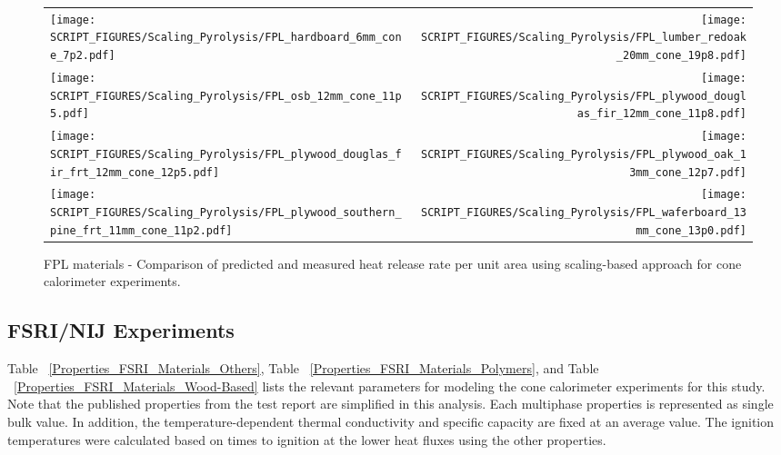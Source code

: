 \begin{figure}[p]
\begin{tabular*}{\textwidth}{l@{\extracolsep{\fill}}r}
\texttt{[image: SCRIPT\_FIGURES/Scaling\_Pyrolysis/FPL\_hardboard\_6mm\_cone\_7p2.pdf]} &
\texttt{[image: SCRIPT\_FIGURES/Scaling\_Pyrolysis/FPL\_lumber\_redoak\_20mm\_cone\_19p8.pdf]} \\
\texttt{[image: SCRIPT\_FIGURES/Scaling\_Pyrolysis/FPL\_osb\_12mm\_cone\_11p5.pdf]} &
\texttt{[image: SCRIPT\_FIGURES/Scaling\_Pyrolysis/FPL\_plywood\_douglas\_fir\_12mm\_cone\_11p8.pdf]} \\
\texttt{[image: SCRIPT\_FIGURES/Scaling\_Pyrolysis/FPL\_plywood\_douglas\_fir\_frt\_12mm\_cone\_12p5.pdf]} &
\texttt{[image: SCRIPT\_FIGURES/Scaling\_Pyrolysis/FPL\_plywood\_oak\_13mm\_cone\_12p7.pdf]} \\
\texttt{[image: SCRIPT\_FIGURES/Scaling\_Pyrolysis/FPL\_plywood\_southern\_pine\_frt\_11mm\_cone\_11p2.pdf]} &
\texttt{[image: SCRIPT\_FIGURES/Scaling\_Pyrolysis/FPL\_waferboard\_13mm\_cone\_13p0.pdf]} \\
\end{tabular*}
\caption[HRRPUA of FPL Materials using scaling model]
{FPL materials - Comparison of predicted and measured heat release rate per unit area using scaling-based approach for cone calorimeter experiments.}
\label{FPL_Materials_HRR_Wood-Based}
\end{figure}

\clearpage

\subsection{FSRI/NIJ Experiments}\label{sec_FSRI_NIJ_Materials}

Table ~\ref{Properties_FSRI_Materials_Others}, Table ~\ref{Properties_FSRI_Materials_Polymers}, and Table ~\ref{Properties_FSRI_Materials_Wood-Based} lists the relevant parameters for modeling the cone calorimeter experiments for this study.
Note that the published properties from the test report are simplified in this analysis. Each multiphase properties is represented as single bulk value.
In addition, the temperature-dependent thermal conductivity and specific capacity are fixed at an average value.
The ignition temperatures were calculated based on times to ignition at the lower heat fluxes using the other properties.

